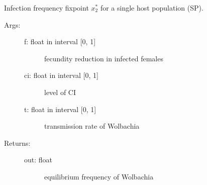 \documentclass[letterpaper,10pt,english]{sphinxmanual}
\begin{document}
\begin{fulllineitems}
\label{index:wspec.analytical.fix2_SP}
Infection frequency fixpoint $x_2^{\ast}$ for a single host population (SP).
\begin{description}
\item[{Args:}] \leavevmode\begin{description}
\item[{f: float in interval {[}0, 1{]}}] \leavevmode
fecundity reduction in infected females

\item[{ci: float in interval {[}0, 1{]}}] \leavevmode
level of CI

\item[{t: float in interval {[}0, 1{]}}] \leavevmode
transmission rate of Wolbachia

\end{description}

\item[{Returns:}] \leavevmode\begin{description}
\item[{out: float}] \leavevmode
equilibrium frequency of Wolbachia

\end{description}

\end{description}

\end{fulllineitems}

\end{document}

